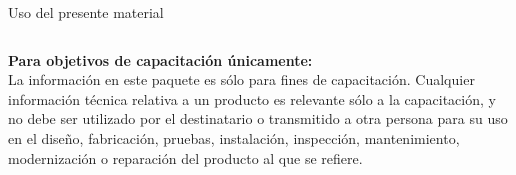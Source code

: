 \begin{frame}[t]{Uso del presente material}

    \begin{columns}[onlytextwidth]  %
        \textbf{Para objetivos de capacitación únicamente:}\\
        \vspace{0.5cm}               %
        \centering
        \justifying
        La información en este paquete es sólo para fines de capacitación.
        Cualquier información técnica relativa a un producto es relevante sólo
        a la capacitación, y no debe ser utilizado por el destinatario o
        transmitido a otra persona para su uso en el diseño, fabricación,
        pruebas, instalación, inspección, mantenimiento, modernización o
        reparación del producto al que se refiere.
    \end{columns}
\end{frame}



